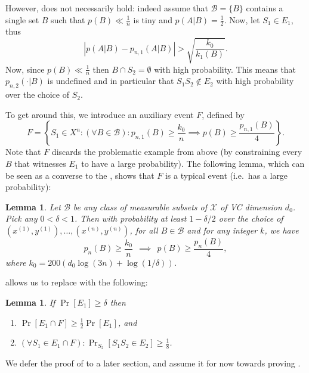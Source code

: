 \documentclass{article}
\def\X{{\mathcal X}}
\def\B{{\mathcal B}}
\newtheorem{lemma}[theorem]{Lemma}
\newcommand{\comment}[3]{}  %
\newcommand{\shay}[1]{\comment{purple}{Shay}{#1}}
\begin{document}
However,  does not necessarily hold: indeed assume that $\B=\{B\}$ contains
	a single set $B$ such that $p(B) \ll \frac{1}{n}$ is tiny and $p(A \vert B) = \frac{1}{2}$. 
	Now, let $S_1\in E_1$, thus
	\[
	\left\lvert p(A \vert B) - p_{n,1}(A \vert B) \right\rvert > 
	\sqrt{\frac{k_0}{k_{1}(B)}}.
	\]
	Now, since $p(B) \ll \frac{1}{n}$ then $B\cap S_2 = \emptyset$ with high probability.
	This means that $p_{n,2}(\cdot \vert B)$ is undefined and in particular that $S_1S_2\notin E_2$ 
	with high probability over the choice of $S_2$.

%

To get around this, we introduce an auxiliary event $F$, defined by
\[F = \left\{S_1\in X^{n} : (\forall B\in\B): p_{n,1}(B) \geq \frac{k_0}{n} \implies p(B)\geq \frac{p_{n,1}(B)}{4}\right\}. \]
Note that $F$ discards the problematic example from above 
(by constraining every $B$ that witnesses $E_1$ to have a large probability). 
The following lemma, which can be seen as a converse to the , 
shows that $F$ is a typical event (i.e.\ has a large probability):
\shay{Maybe move this lemma to after \Cref{lemma:points-in-balls}}
\begin{lemma}\label{lem:Fistypical}
Let $\B$ be any class of measurable subsets of $\X$ of VC dimension $d_0$. Pick any $0 < \delta < 1$. Then with probability at least $1-\delta/2$ over the choice of $(x^{(1)}, y^{(1)}), \ldots, (x^{(n)}, y^{(n)})$, for all $B \in \B$ and for any integer $k$, we have
\[ p_n(B) \geq \frac{k_0}{n}
\ \ \implies \ \ 
p(B) \geq \frac{p_n(B)}{4},\]
where $k_0 = 200 \left(d_0 \log(3n) + \log(1/\delta)\right)$.
\end{lemma}

 allows us to replace  with the following:
\begin{lemma}\label{lem:reduction}
If $\Pr[E_1]\geq \delta$ then 
\begin{enumerate}
\item $\Pr[E_1\cap F] \geq \frac{1}{2}\Pr[E_1]$, and
\item $(\forall S_1\in E_1\cap F): \Pr_{S_2}[S_1S_2\in E_2] \geq \frac{1}{8}$. 
\end{enumerate}
\end{lemma}
We defer the proof of  to a later section, 
and assume it for now towards proving .
\end{document}
